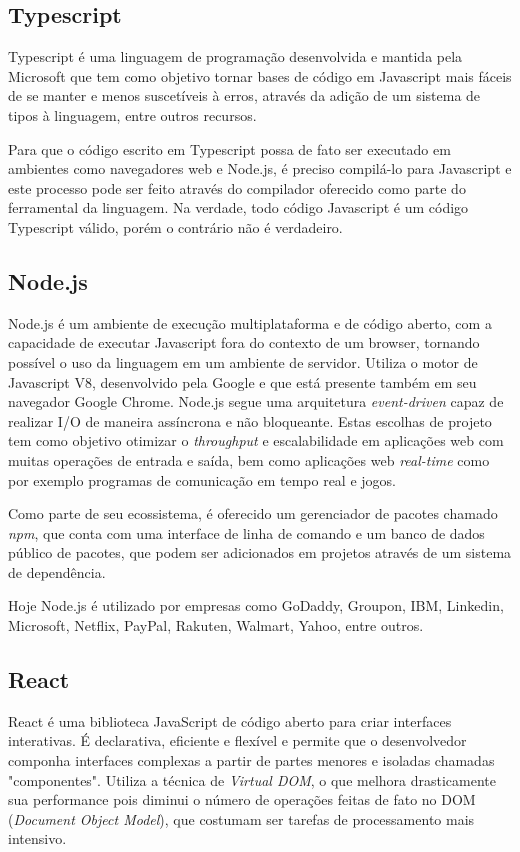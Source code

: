 	
\subsection{Typescript}
Typescript é uma linguagem de programação desenvolvida e mantida pela Microsoft que tem como objetivo tornar bases de código em Javascript mais fáceis de se manter e menos suscetíveis à erros, através da adição de um sistema de tipos à linguagem, entre outros recursos. 

Para que o código escrito em Typescript possa de fato ser executado em ambientes como navegadores web e Node.js, é preciso compilá-lo para Javascript e este processo pode ser
feito através do compilador oferecido como parte do ferramental da linguagem. Na verdade, todo código Javascript é um código Typescript válido, porém o contrário não é verdadeiro.

\subsection{Node.js}
Node.js é um ambiente de execução multiplataforma e de código aberto, com a capacidade de executar Javascript fora do contexto de um browser, tornando possível o uso da linguagem em um ambiente de servidor.
Utiliza o motor de Javascript V8, desenvolvido pela Google e que está presente também em seu navegador Google Chrome. Node.js segue uma arquitetura \textit{event-driven} capaz de realizar I/O de maneira assíncrona e não bloqueante. Estas escolhas de projeto tem como objetivo otimizar o \textit{throughput} e escalabilidade em aplicações web com muitas operações de entrada e saída, bem como aplicações web \textit{real-time} como por exemplo programas de comunicação em tempo real e jogos.

Como parte de seu ecossistema, é oferecido um gerenciador de pacotes chamado \textit{npm}, que conta com uma interface de linha de comando e um banco de dados público de pacotes, que podem ser adicionados em projetos através de um sistema de dependência.

Hoje Node.js é utilizado por empresas como GoDaddy, Groupon, IBM, Linkedin, Microsoft, Netflix, PayPal, Rakuten, Walmart, Yahoo, entre outros.

\subsection{React}
React é uma biblioteca JavaScript de código aberto para criar interfaces interativas. É declarativa, eficiente e flexível e permite que o desenvolvedor componha interfaces complexas a partir de partes menores e isoladas chamadas "componentes".
Utiliza a técnica de \textit{Virtual DOM}, o que melhora drasticamente sua performance pois diminui o número de operações feitas de fato no DOM (\textit{Document Object Model}), que costumam ser tarefas de processamento mais intensivo.

